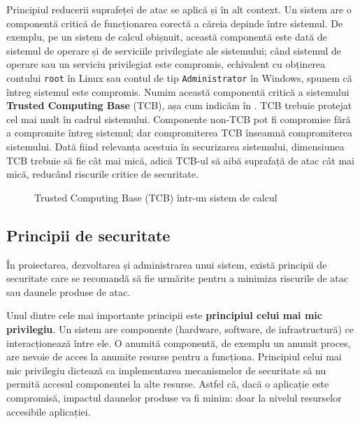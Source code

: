 Principiul reducerii suprafeței de atac se aplică și în alt context. Un sistem are o componentă critică de funcționarea corectă a căreia depinde între sistemul. De exemplu, pe un sistem de calcul obișnuit, această componentă este dată de sistemul de operare și de serviciile privilegiate ale sistemului; când sistemul de operare sau un serviciu privilegiat este compromis, echivalent cu obținerea contului \texttt{root} în Linux sau contul de tip \texttt{Administrator} în Windows, spunem că întreg sistemul este compromis. Numim această componentă critică a sistemului \textbf{Trusted Computing Base} (TCB), așa cum indicăm în . TCB trebuie protejat cel mai mult în cadrul sistemului. Componente non-TCB pot fi compromise fără a compromite întreg sistemul; dar compromiterea TCB înseamnă compromiterea sistemului. Dată fiind relevanța acestuia în securizarea sistemului, dimensiunea TCB trebuie să fie cât mai mică, adică TCB-ul să aibă suprafață de atac cât mai mică, reducând riscurile critice de securitate.

\begin{figure}[htbp]
  \centering
  \def\svgwidth{\columnwidth}
  
  \caption{Trusted Computing Base (TCB) într-un sistem de calcul}
  \label{fig:sec:tcb}
\end{figure}

\subsection{Principii de securitate}
\label{sec:sec:fundamentals:principles}

În proiectarea, dezvoltarea și administrarea unui sistem, există principii de securitate care se recomandă să fie urmărite pentru a minimiza riscurile de atac sau daunele produse de atac.

Unul dintre cele mai importante principii este \textbf{principiul celui mai mic privilegiu}. Un sistem are componente (hardware, software, de infrastructură) ce interacționează între ele. O anumită componentă, de exemplu un anumit proces, are nevoie de acces la anumite resurse pentru a funcționa. Principiul celui mai mic privilegiu dictează ca implementarea mecanismelor de securitate să nu permită accesul componentei la alte resurse. Astfel că, dacă o aplicație este compromisă, impactul daunelor produse va fi minim: doar la nivelul resurselor accesibile aplicației.

